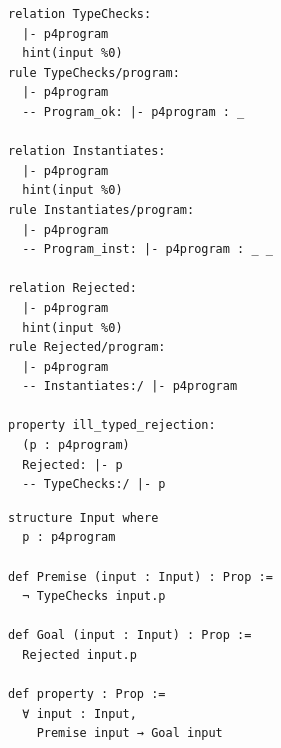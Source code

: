\begin{minipage}[b]{0.485\linewidth}
\begin{lstlisting}[style=spectecexample]
relation TypeChecks:
  |- p4program
  hint(input %0)
rule TypeChecks/program:
  |- p4program
  -- Program_ok: |- p4program : _

relation Instantiates:
  |- p4program
  hint(input %0)
rule Instantiates/program:
  |- p4program
  -- Program_inst: |- p4program : _ _

relation Rejected:
  |- p4program
  hint(input %0)
rule Rejected/program:
  |- p4program
  -- Instantiates:/ |- p4program

property ill_typed_rejection:
  (p : p4program)
  Rejected: |- p
  -- TypeChecks:/ |- p
\end{lstlisting}
\end{minipage}\hfill
\begin{minipage}[b]{0.485\linewidth}
\begin{lstlisting}[style=leanexample]
structure Input where
  p : p4program

def Premise (input : Input) : Prop :=
  ¬ TypeChecks input.p

def Goal (input : Input) : Prop :=
  Rejected input.p

def property : Prop :=
  ∀ input : Input,
    Premise input → Goal input
\end{lstlisting}
\end{minipage}

